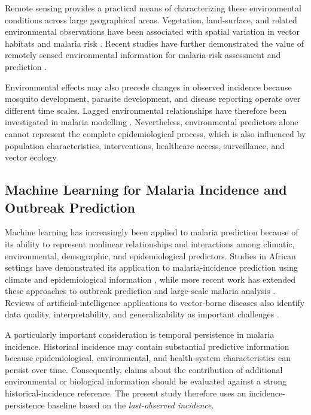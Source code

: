 \documentclass[10pt,twocolumn]{article}
\begin{document}
Remote sensing provides a practical means of characterizing these
environmental conditions across large geographical areas. Vegetation,
land-surface, and related environmental observations have been
associated with spatial variation in vector habitats and malaria risk
\parencite{Ferraguti2023,Sheela2017,Rakotoarinia2022}. Recent studies
have further demonstrated the value of remotely sensed environmental
information for malaria-risk assessment and prediction
\parencite{Cuellar2025}.

Environmental effects may also precede changes in observed incidence
because mosquito development, parasite development, and disease
reporting operate over different time scales. Lagged environmental
relationships have therefore been investigated in malaria modelling
\parencite{Okiring2021}. Nevertheless, environmental predictors alone
cannot represent the complete epidemiological process, which is also
influenced by population characteristics, interventions, healthcare
access, surveillance, and vector ecology.


\subsection{Machine Learning for Malaria Incidence and Outbreak Prediction}

Machine learning has increasingly been applied to malaria prediction
because of its ability to represent nonlinear relationships and
interactions among climatic, environmental, demographic, and
epidemiological predictors. Studies in African settings have
demonstrated its application to malaria-incidence prediction using
climate and epidemiological information
\parencite{Masinde2020,Odu2021}, while more recent work has extended
these approaches to outbreak prediction and large-scale malaria
analysis \parencite{Khan2024,RahmanShiddik2025}. Reviews of
artificial-intelligence applications to vector-borne diseases also
identify data quality, interpretability, and generalizability as
important challenges \parencite{Kaur2022}.

A particularly important consideration is temporal persistence in
malaria incidence. Historical incidence may contain substantial
predictive information because epidemiological, environmental, and
health-system characteristics can persist over time. Consequently,
claims about the contribution of additional environmental or biological
information should be evaluated against a strong historical-incidence
reference. The present study therefore uses an incidence-persistence
baseline based on the \emph{last-observed incidence}.
\end{document}
